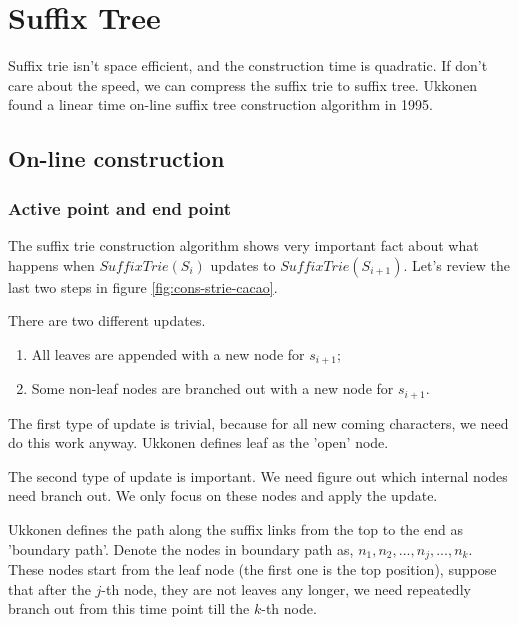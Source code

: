 \documentclass[UTF8]{article}
\begin{document}
\section{Suffix Tree}

Suffix trie isn't space efficient, and the construction time
is quadratic. If don't care about the speed, we can compress the
suffix trie to suffix tree\cite{trivial-stree-java}. Ukkonen
found a linear time on-line suffix tree construction algorithm
in 1995.

\subsection{On-line construction}

\subsubsection{Active point and end point}
\label{ap-and-ep}

The suffix trie construction algorithm shows very
important fact about what happens when $SuffixTrie(S_i)$ updates to
$SuffixTrie(S_{i+1})$. Let's review the last two steps in figure
\ref{fig:cons-strie-cacao}.

There are two different updates.
\begin{enumerate}
\item All leaves are appended with a new node for $s_{i+1}$;
\item Some non-leaf nodes are branched out with a new node for $s_{i+1}$.
\end{enumerate}

The first type of update is trivial, because for all new coming characters,
we need do this work anyway. Ukkonen defines leaf as the 'open' node.

The second type of update is important. We need figure out which internal
nodes need branch out. We only focus on these nodes and apply the
update.

Ukkonen defines the path along the suffix links from the top to the end
as 'boundary path'.
Denote the nodes in boundary path  as, $n_1, n_2, ..., n_j, ..., n_k$.
These nodes start from the leaf node (the first one is the top position),
suppose that after the $j$-th node, they are not leaves any longer,
we need repeatedly branch out from this time point till the $k$-th node.
\end{document}
